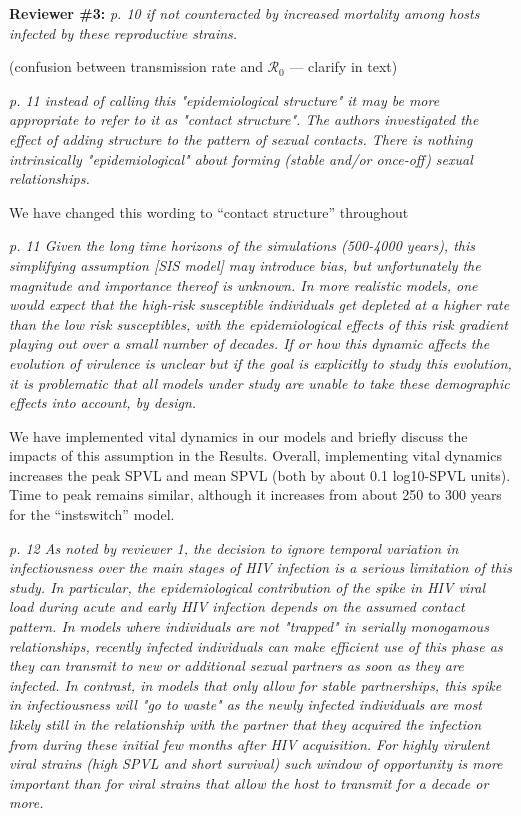 \documentclass[10pt]{letter}
\newcommand{\revcomment}[1]{\emph{#1}}
\newcommand{\response}[1]{#1}
\begin{document}
\begin{letter}{
}
\textbf{Reviewer \#3:}
\revcomment{
p. 10 if not counteracted by increased mortality among hosts infected by these reproductive strains.
}

\response{(confusion between transmission rate and  ${\mathcal R}_0$ ---
  clarify in text)
}

\revcomment{
p. 11 instead of calling this "epidemiological structure" it may be more appropriate to refer to it as "contact structure". The authors investigated the effect of adding structure to the pattern of sexual contacts. There is nothing intrinsically "epidemiological" about forming (stable and/or once-off) sexual relationships.
}

\response{
  We have changed this wording to ``contact structure'' throughout
}

\revcomment{
p. 11 Given the long time horizons of the simulations (500-4000
years), this simplifying assumption [SIS model] may introduce bias, but unfortunately the magnitude and importance thereof is unknown. In more realistic models, one would expect that the high-risk susceptible individuals get depleted at a higher rate than the low risk susceptibles, with the epidemiological effects of this risk gradient playing out over a small number of decades. If or how this dynamic affects the evolution of virulence is unclear but if the goal is explicitly to study this evolution, it is problematic that all models under study are unable to take these demographic effects into account, by design.
}

\response{
We have implemented vital dynamics in our models and briefly discuss the impacts of this assumption in the Results.
Overall, implementing vital dynamics increases the peak SPVL and mean SPVL (both by about 0.1 log10-SPVL units). 
Time to peak remains similar, although it increases from about 250 to 300 years for the ``instswitch'' model.

}

\revcomment{
p. 12 As noted by reviewer 1, the decision to ignore temporal variation in
infectiousness over the main stages of HIV infection is a serious
limitation of this study. In particular, the epidemiological
contribution of the spike in HIV viral load during acute and early HIV
infection depends on the assumed contact pattern. In models where
individuals are not "trapped" in serially monogamous relationships,
recently infected individuals can make efficient use of this phase as
they can transmit to new or additional sexual partners as soon as they
are infected. In contrast, in models that only allow for stable
partnerships, this spike in infectiousness will "go to waste" as the
newly infected individuals are most likely still in the relationship
with the partner that they acquired the infection from during these
initial few months after HIV acquisition. For highly virulent viral
strains (high SPVL and short survival) such window of opportunity is
more important than for viral strains that allow the host to transmit
for a decade or more.
}


\end{letter}
\end{document}
